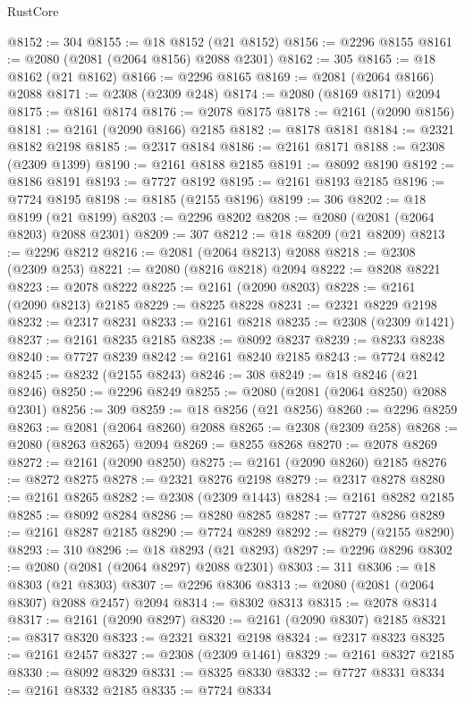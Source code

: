\begin{lexlean}{RustCore}
\begin{coremodule}
@8152 := 304
@8155 := @18 @8152 (@21 @8152)
@8156 := @2296 @8155
@8161 := @2080 (@2081 (@2064 @8156) @2088 @2301)
@8162 := 305
@8165 := @18 @8162 (@21 @8162)
@8166 := @2296 @8165
@8169 := @2081 (@2064 @8166) @2088
@8171 := @2308 (@2309 @248)
@8174 := @2080 (@8169 @8171) @2094
@8175 := @8161 @8174
@8176 := @2078 @8175
@8178 := @2161 (@2090 @8156)
@8181 := @2161 (@2090 @8166) @2185
@8182 := @8178 @8181
@8184 := @2321 @8182 @2198
@8185 := @2317 @8184
@8186 := @2161 @8171
@8188 := @2308 (@2309 @1399)
@8190 := @2161 @8188 @2185
@8191 := @8092 @8190
@8192 := @8186 @8191
@8193 := @7727 @8192
@8195 := @2161 @8193 @2185
@8196 := @7724 @8195
@8198 := @8185 (@2155 @8196)
@8199 := 306
@8202 := @18 @8199 (@21 @8199)
@8203 := @2296 @8202
@8208 := @2080 (@2081 (@2064 @8203) @2088 @2301)
@8209 := 307
@8212 := @18 @8209 (@21 @8209)
@8213 := @2296 @8212
@8216 := @2081 (@2064 @8213) @2088
@8218 := @2308 (@2309 @253)
@8221 := @2080 (@8216 @8218) @2094
@8222 := @8208 @8221
@8223 := @2078 @8222
@8225 := @2161 (@2090 @8203)
@8228 := @2161 (@2090 @8213) @2185
@8229 := @8225 @8228
@8231 := @2321 @8229 @2198
@8232 := @2317 @8231
@8233 := @2161 @8218
@8235 := @2308 (@2309 @1421)
@8237 := @2161 @8235 @2185
@8238 := @8092 @8237
@8239 := @8233 @8238
@8240 := @7727 @8239
@8242 := @2161 @8240 @2185
@8243 := @7724 @8242
@8245 := @8232 (@2155 @8243)
@8246 := 308
@8249 := @18 @8246 (@21 @8246)
@8250 := @2296 @8249
@8255 := @2080 (@2081 (@2064 @8250) @2088 @2301)
@8256 := 309
@8259 := @18 @8256 (@21 @8256)
@8260 := @2296 @8259
@8263 := @2081 (@2064 @8260) @2088
@8265 := @2308 (@2309 @258)
@8268 := @2080 (@8263 @8265) @2094
@8269 := @8255 @8268
@8270 := @2078 @8269
@8272 := @2161 (@2090 @8250)
@8275 := @2161 (@2090 @8260) @2185
@8276 := @8272 @8275
@8278 := @2321 @8276 @2198
@8279 := @2317 @8278
@8280 := @2161 @8265
@8282 := @2308 (@2309 @1443)
@8284 := @2161 @8282 @2185
@8285 := @8092 @8284
@8286 := @8280 @8285
@8287 := @7727 @8286
@8289 := @2161 @8287 @2185
@8290 := @7724 @8289
@8292 := @8279 (@2155 @8290)
@8293 := 310
@8296 := @18 @8293 (@21 @8293)
@8297 := @2296 @8296
@8302 := @2080 (@2081 (@2064 @8297) @2088 @2301)
@8303 := 311
@8306 := @18 @8303 (@21 @8303)
@8307 := @2296 @8306
@8313 := @2080 (@2081 (@2064 @8307) @2088 @2457) @2094
@8314 := @8302 @8313
@8315 := @2078 @8314
@8317 := @2161 (@2090 @8297)
@8320 := @2161 (@2090 @8307) @2185
@8321 := @8317 @8320
@8323 := @2321 @8321 @2198
@8324 := @2317 @8323
@8325 := @2161 @2457
@8327 := @2308 (@2309 @1461)
@8329 := @2161 @8327 @2185
@8330 := @8092 @8329
@8331 := @8325 @8330
@8332 := @7727 @8331
@8334 := @2161 @8332 @2185
@8335 := @7724 @8334

\end{coremodule}
\end{lexlean}
